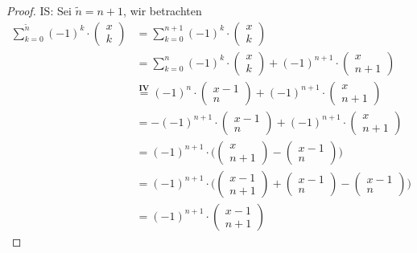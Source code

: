 \begin{proof}
IS: Sei $\tilde{n}=n+1$, wir betrachten
\begin{align*}
\sum_{k=0}^{\tilde{n}}(-1)^k\cdot
\begin{pmatrix}
x \\
k
\end{pmatrix}
&=
\sum_{k=0}^{n+1}(-1)^k\cdot
\begin{pmatrix}
x \\
k
\end{pmatrix}\\
&=
\sum_{k=0}^{n}(-1)^k\cdot
\begin{pmatrix}
x \\
k
\end{pmatrix}+
(-1)^{n+1}\cdot
\begin{pmatrix}
x \\
n+1
\end{pmatrix}\\
&\overset{\mathbf{IV}}{=}
(-1)^n\cdot
\begin{pmatrix}
x-1 \\
n
\end{pmatrix}+
(-1)^{n+1}\cdot
\begin{pmatrix}
x \\
n+1
\end{pmatrix}\\
&=
-(-1)^{n+1}\cdot
\begin{pmatrix}
x-1 \\
n
\end{pmatrix}+
(-1)^{n+1}\cdot
\begin{pmatrix}
x \\
n+1
\end{pmatrix}\\
&=
(-1)^{n+1}\cdot\Bigg(
\begin{pmatrix}
x \\
n+1
\end{pmatrix}-
\begin{pmatrix}
x-1 \\
n
\end{pmatrix}
\Bigg)\\
&=
(-1)^{n+1}\cdot\Bigg(
\begin{pmatrix}
x-1 \\
n+1
\end{pmatrix}+
\begin{pmatrix}
x-1 \\
n
\end{pmatrix}-
\begin{pmatrix}
x-1 \\
n
\end{pmatrix}
\Bigg)\\
&=
(-1)^{n+1}\cdot
\begin{pmatrix}
x-1 \\
n+1
\end{pmatrix}
\end{align*}
\end{proof}

